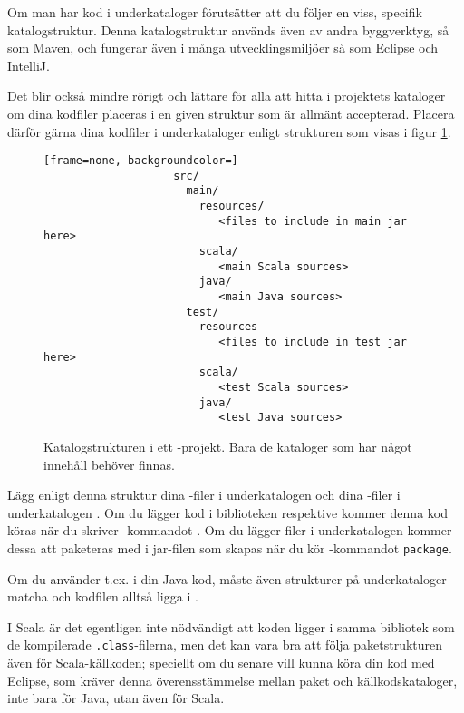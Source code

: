 Om man har kod i underkataloger förutsätter \sbt att du följer en viss, specifik katalogstruktur. Denna katalogstruktur används även av andra byggverktyg, så som Maven, och fungerar även i många utvecklingsmiljöer så som Eclipse och IntelliJ. 

Det blir också mindre rörigt och lättare för alla att hitta i projektets kataloger om dina kodfiler placeras i en given struktur som är allmänt accepterad.
Placera därför gärna dina kodfiler i underkataloger enligt strukturen som visas i figur \ref{fig:sbt:dir-structure}. 

\begin{figure}
\centering

\begin{lstlisting}[frame=none, backgroundcolor=]
					src/
					  main/
					    resources/
					       <files to include in main jar here>
					    scala/
					       <main Scala sources>
					    java/
					       <main Java sources>
					  test/
					    resources
					       <files to include in test jar here>
					    scala/
					       <test Scala sources>
					    java/
					       <test Java sources>
\end{lstlisting}

\caption{Katalogstrukturen i ett \sbt-projekt. Bara de kataloger som har något innehåll behöver finnas.}
\label{fig:sbt:dir-structure}
\end{figure}

\noindent Lägg enligt denna struktur dina -filer i underkatalogen  och dina -filer i underkatalogen . Om du lägger kod i biblioteken   respektive  kommer denna kod köras när du skriver \sbt-kommandot . Om du lägger filer i underkatalogen  kommer dessa att paketeras med i jar-filen som skapas när du kör \sbt-kommandot \texttt{package}.

Om du använder t.ex.  i din Java-kod, måste även strukturer på underkataloger matcha och kodfilen alltså ligga i  .

I Scala är det egentligen inte nödvändigt att koden ligger i samma bibliotek som de kompilerade \texttt{.class}-filerna, men det kan vara bra att följa paketstrukturen även för Scala-källkoden; speciellt om du senare vill kunna köra din kod med Eclipse, som kräver denna överensstämmelse mellan paket och källkodskataloger, inte bara för Java, utan även för Scala.


